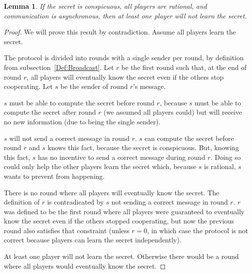 \documentclass[12pt]{article}
\newtheorem{lemma}{Lemma}
\begin{document}
\begin{lemma}\label{Lem:Async:ConspicuousMustSacrifice}If the secret is conspicuous, all players are rational, and communication is asynchronous, then at least one player will not learn the secret.\end{lemma}
\begin{proof}
We will prove this result by contradiction. Assume all players learn the secret.

The protocol is divided into rounds with a single sender per round, by definition from subsection~\ref{Def:Broadcast}. Let $r$ be the first round such that, at the end of round $r$, all players will eventually know the secret even if the others stop cooperating. Let $s$ be the sender of round $r$'s message.

$s$ must be able to compute the secret before round $r$, because $s$ must be able to compute the secret after round $r$ (we assumed all players could) but will receive no new information (due to being the single sender).

$s$ will not send a correct message in round $r$. $s$ can compute the secret before round $r$ and $s$ knows this fact, because the secret is conspicuous. But, knowing this fact, $s$ has no incentive to send a correct message during round $r$. Doing so could only help the other players learn the secret which, because $s$ is rational, $s$ wants to prevent from happening.

There is no round where all players will eventually know the secret. The definition of $r$ is contradicated by $s$ not sending a correct message in round $r$. $r$ was defined to be the first round where all players were guaranteed to eventually know the secret even if the others stopped cooperating, but now the previous round also satisfies that constraint (unless $r=0$, in which case the protocol is not correct because players can learn the secret independently).

At least one player will not learn the secret. Otherwise there would be a round where all players would eventually know the secret.
\end{proof}
\end{document}
